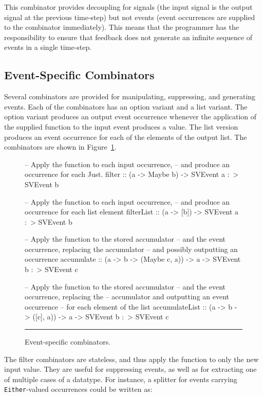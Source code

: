 This combinator provides decoupling for signals
(the input signal is the output signal at the previous time-step)
but not events (event occurrences are supplied to the combinator immediately).
This means that the programmer has the responsibility to ensure that feedback
does not generate an infinite sequence of events in a single time-step.

\subsection{Event-Specific Combinators}
\label{subsection:System_Design_and_Interface-Combinators-Event_specific_combinators}

Several combinators are provided for manipulating, suppressing, and generating events.
Each of the combinators has an option variant and a list variant. The option variant
produces an output event occurrence whenever the application of the supplied function
to the input event produces a value. The list version produces an event occurrence for
each of the elements of the output list. The combinators are shown in Figure~\ref{figure:event_specific_combinators}.

\begin{figure}
\begin{code}
-- Apply the function to each input occurrence,
-- and produce an occurrence for each Just.
filter :: (a -> Maybe b) -> SVEvent a :~> SVEvent b

-- Apply the function to each input occurrence,
-- and produce an occurrence for each list element
filterList :: (a -> [b]) -> SVEvent a :~> SVEvent b

-- Apply the function to the stored accumulator
-- and the event occurrence, replacing the accumulator
-- and possibly outputting an occurrence
accumulate ::    (a -> b -> (Maybe c, a))
              -> a
              -> SVEvent b :~> SVEvent c

-- Apply the function to the stored accumulator
-- and the event occurrence, replacing the
-- accumulator and outputting an event occurrence
-- for each element of the list
accumulateList ::    (a -> b -> ([c], a))
                  -> a
                  -> SVEvent b :~> SVEvent c
\end{code}
\hrule
\caption{Event-specific combinators.}
\label{figure:event_specific_combinators}
\end{figure}

The filter combinators are stateless, and thus apply the function to only the new
input value. They are useful for suppressing events, as well as for extracting one
of multiple cases of a datatype. For instance, a splitter for events carrying
{\tt Either}-valued occurrences could be written as:

